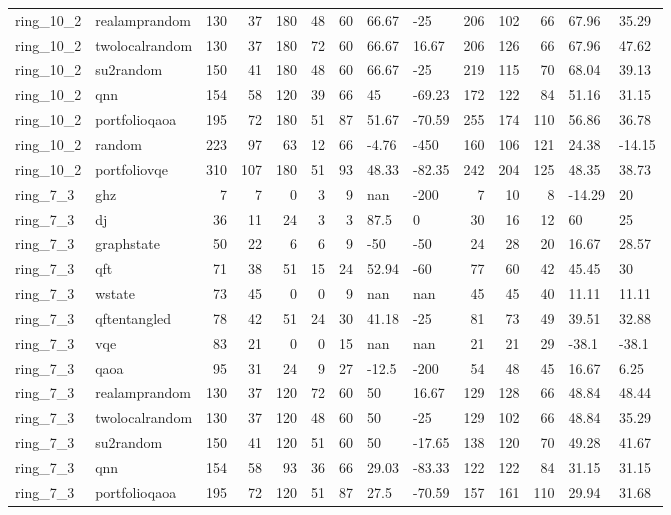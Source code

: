\begin{longtable}{llrrrrrllrrrll}
ring\_10\_2 & realamprandom & 130 & 37 & 180 & 48 & 60 & 66.67 & -25 & 206 & 102 & 66 & 67.96 & 35.29 \\
ring\_10\_2 & twolocalrandom & 130 & 37 & 180 & 72 & 60 & 66.67 & 16.67 & 206 & 126 & 66 & 67.96 & 47.62 \\
ring\_10\_2 & su2random & 150 & 41 & 180 & 48 & 60 & 66.67 & -25 & 219 & 115 & 70 & 68.04 & 39.13 \\
ring\_10\_2 & qnn & 154 & 58 & 120 & 39 & 66 & 45 & -69.23 & 172 & 122 & 84 & 51.16 & 31.15 \\
ring\_10\_2 & portfolioqaoa & 195 & 72 & 180 & 51 & 87 & 51.67 & -70.59 & 255 & 174 & 110 & 56.86 & 36.78 \\
ring\_10\_2 & random & 223 & 97 & 63 & 12 & 66 & -4.76 & -450 & 160 & 106 & 121 & 24.38 & -14.15 \\
ring\_10\_2 & portfoliovqe & 310 & 107 & 180 & 51 & 93 & 48.33 & -82.35 & 242 & 204 & 125 & 48.35 & 38.73 \\
ring\_7\_3 & ghz & 7 & 7 & 0 & 3 & 9 & nan & -200 & 7 & 10 & 8 & -14.29 & 20 \\
ring\_7\_3 & dj & 36 & 11 & 24 & 3 & 3 & 87.5 & 0 & 30 & 16 & 12 & 60 & 25 \\
ring\_7\_3 & graphstate & 50 & 22 & 6 & 6 & 9 & -50 & -50 & 24 & 28 & 20 & 16.67 & 28.57 \\
ring\_7\_3 & qft & 71 & 38 & 51 & 15 & 24 & 52.94 & -60 & 77 & 60 & 42 & 45.45 & 30 \\
ring\_7\_3 & wstate & 73 & 45 & 0 & 0 & 9 & nan & nan & 45 & 45 & 40 & 11.11 & 11.11 \\
ring\_7\_3 & qftentangled & 78 & 42 & 51 & 24 & 30 & 41.18 & -25 & 81 & 73 & 49 & 39.51 & 32.88 \\
ring\_7\_3 & vqe & 83 & 21 & 0 & 0 & 15 & nan & nan & 21 & 21 & 29 & -38.1 & -38.1 \\
ring\_7\_3 & qaoa & 95 & 31 & 24 & 9 & 27 & -12.5 & -200 & 54 & 48 & 45 & 16.67 & 6.25 \\
ring\_7\_3 & realamprandom & 130 & 37 & 120 & 72 & 60 & 50 & 16.67 & 129 & 128 & 66 & 48.84 & 48.44 \\
ring\_7\_3 & twolocalrandom & 130 & 37 & 120 & 48 & 60 & 50 & -25 & 129 & 102 & 66 & 48.84 & 35.29 \\
ring\_7\_3 & su2random & 150 & 41 & 120 & 51 & 60 & 50 & -17.65 & 138 & 120 & 70 & 49.28 & 41.67 \\
ring\_7\_3 & qnn & 154 & 58 & 93 & 36 & 66 & 29.03 & -83.33 & 122 & 122 & 84 & 31.15 & 31.15 \\
ring\_7\_3 & portfolioqaoa & 195 & 72 & 120 & 51 & 87 & 27.5 & -70.59 & 157 & 161 & 110 & 29.94 & 31.68 \\

\end{longtable}
